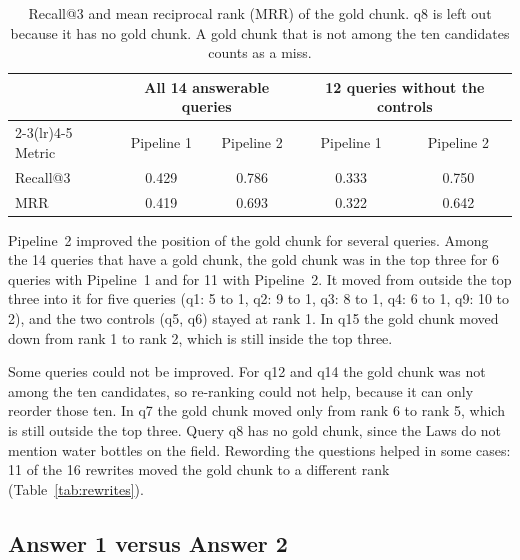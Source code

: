 \documentclass[11pt,a4paper]{article}
\begin{document}
\begin{table}[H]
\centering
\small
\begin{tabular}{@{}l cc cc@{}}
\toprule
 & \multicolumn{2}{c}{All 14 answerable queries} & \multicolumn{2}{c}{12 queries without the controls} \\
\cmidrule(lr){2-3}\cmidrule(lr){4-5}
Metric & Pipeline 1 & Pipeline 2 & Pipeline 1 & Pipeline 2 \\
\midrule
Recall@3 & 0.429 & 0.786 & 0.333 & 0.750 \\
MRR & 0.419 & 0.693 & 0.322 & 0.642 \\
\bottomrule
\end{tabular}
\caption{Recall@3 and mean reciprocal rank (MRR) of the gold chunk. q8 is left out because it has no gold chunk. A gold chunk that is not among the ten candidates counts as a miss.}
\label{tab:metrics}
\end{table}

Pipeline~2 improved the position of the gold chunk for several queries. Among the 14 queries that have a gold
chunk, the gold chunk was in the top three for 6 queries with Pipeline~1 and for 11 with Pipeline~2. It moved from
outside the top three into it for five queries (q1: 5 to 1, q2: 9 to 1, q3: 8 to 1, q4: 6 to 1, q9: 10 to 2),
and the two controls (q5, q6) stayed at rank 1. In q15 the gold chunk moved down from rank 1 to rank 2, which is
still inside the top three.

Some queries could not be improved. For q12 and q14 the gold chunk was not among the ten candidates, so
re-ranking could not help, because it can only reorder those ten. In q7 the gold chunk moved only from rank 6 to
rank 5, which is still outside the top three. Query q8 has no gold chunk, since the Laws do not mention water
bottles on the field. Rewording the questions helped in some cases: 11 of the 16 rewrites moved the gold chunk to a
different rank (Table~\ref{tab:rewrites}).

\subsection{Answer 1 versus Answer 2}
\end{document}
